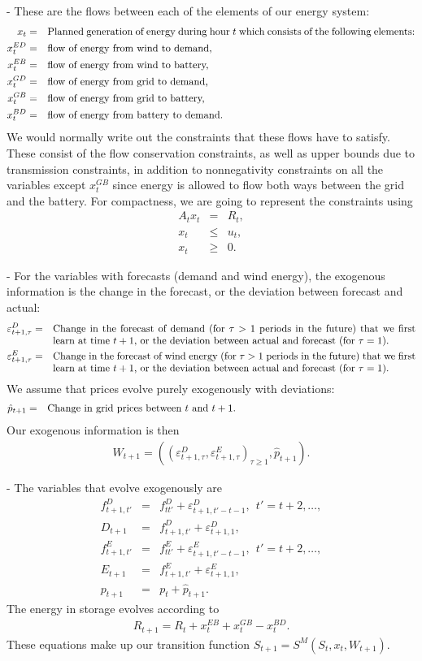 \documentclass[11pt,oneside,fleqn,reqno,titlepage]{article}
\newcommand{\bns}{\begin{eqnarray*}}
\newcommand{\ens}{\end{eqnarray*}}
\newcommand{\textwrap}{\parbox[t]{5.0in}}
\def \phat{\hat p}
\begin{document}
 - These are the flows between each of the elements of our energy system:
\bns
x_{t}      &=& \textwrap{Planned generation of energy during hour $t$ which consists of the following elements:}\\
x^{ED}_{t} &=& \textwrap{flow of energy from wind to demand,}\\
x^{EB}_{t} &=& \textwrap{flow of energy from wind to battery,}\\
x^{GD}_{t} &=& \textwrap{flow of energy from grid to demand,}\\
x^{GB}_{t} &=& \textwrap{flow of energy from grid to battery,}\\
x^{BD}_{t} &=& \textwrap{flow of energy from battery to demand.}
\ens
We would normally write out the constraints that these flows have to satisfy.  These consist of the flow conservation constraints, as well as upper bounds due to transmission constraints, in addition to nonnegativity constraints on all the variables except $x^{GB}_{t}$ since energy is allowed to flow both ways between the grid and the battery.  For compactness, we are going to represent the constraints using
\bns
A_t x_t &=& R_t,\\
x_t     & \leq & u_t,\\
x_t     & \geq & 0.
\ens


 - For the variables with forecasts (demand and wind energy), the exogenous information is the change in the forecast, or the deviation between forecast and actual:
\bns
\varepsilon^D_{t+1,\tau} &=& \textwrap{Change in the forecast of demand (for $\tau > 1$ periods in the future) that we first learn at time $t+1$, or the deviation between actual and forecast (for $\tau = 1$).}\\
\varepsilon^E_{t+1,\tau} &=& \textwrap{Change in the forecast of wind energy (for $\tau > 1$ periods in the future) that we first learn at time $t+1$,  or the deviation between actual and forecast (for $\tau = 1$).}
\ens
We assume that prices evolve purely exogenously with deviations:
\bns
\phat_{t+1} &=& \textwrap{Change in grid prices between $t$ and $t+1$.}
\ens
Our exogenous information is then
\bns
W_{t+1} = ((\varepsilon^D_{t+1,\tau},\varepsilon^E_{t+1,\tau})_{\tau \geq 1}, \phat_{t+1}).
\ens

 - The variables that evolve exogenously are
\bns
f^D_{t+1,t'} &=& f^D_{tt'} + \varepsilon^D_{t+1,t'-t-1},~~t'=t+2, \ldots,\\
D_{t+1}      &=& f^D_{t+1,t'} + \varepsilon^D_{t+1,1},\\
f^E_{t+1,t'} &=& f^E_{tt'} + \varepsilon^E_{t+1,t'-t-1},~~t'=t+2, \ldots,\\
E_{t+1}      &=& f^E_{t+1,t'} + \varepsilon^E_{t+1,1},\\
p_{t+1}      &=& p_t + \phat_{t+1}.
\ens
The energy in storage evolves according to
\bns
R_{t+1} = R_t  + x^{EB}_t + x^{GB}_t - x^{BD}_t.
\ens
These equations make up our transition function $S_{t+1} = S^M(S_t,x_t,W_{t+1})$.\\
\end{document}
